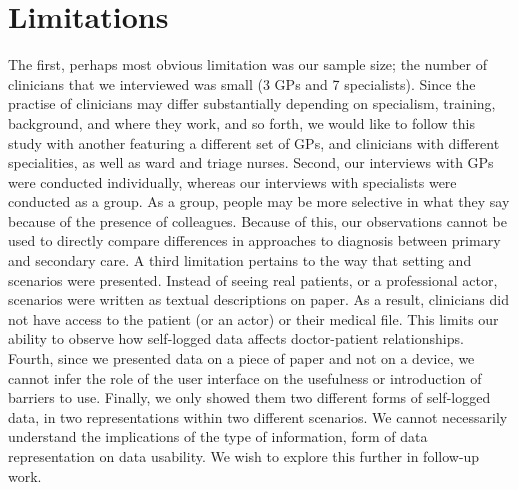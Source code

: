 \documentclass{sigchi}
\begin{document}




\section{Limitations}

The first, perhaps most obvious limitation was our sample size; the number of clinicians that we interviewed was small (3 GPs and 7 specialists).  Since the practise of clinicians may differ substantially depending on specialism, training, background, and where they work, and so forth, we would like to follow this study with another featuring a different set of GPs, and clinicians with different specialities, as well as ward and triage nurses. Second, our interviews with GPs were conducted individually, whereas our interviews with specialists were conducted as a group. As a group, people may be more selective in what they say because of the presence of colleagues. Because of this, our observations cannot be used to directly compare differences in approaches to diagnosis between primary and secondary care.  A third limitation pertains to the way that setting and scenarios were presented. Instead of seeing real patients, or a professional actor, scenarios were written as textual descriptions on paper.  As a result, clinicians did not have access to the patient (or an actor) or their medical file. This limits our ability to observe how self-logged data affects doctor-patient relationships. Fourth, since we presented data on a piece of paper and not on a device, we cannot infer the role of the user interface on the usefulness or introduction of barriers to use. Finally, we only showed them two different forms of self-logged data, in two representations within two different scenarios. We cannot necessarily understand the implications of the type of information, form of data representation on data usability. We wish to explore this further in follow-up work.
\end{document}
